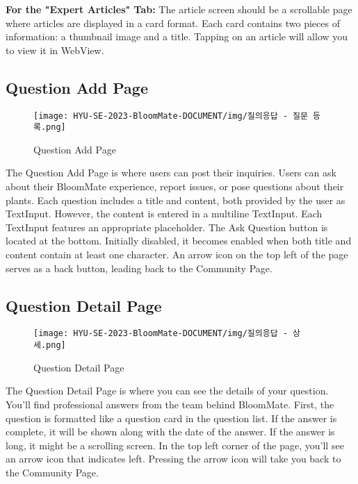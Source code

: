 \documentclass[conference, a4paper]{IEEEtran}
\begin{document}
\textbf{For the "Expert Articles" Tab:} The article screen should be a scrollable page where articles are displayed in a card format. Each card contains two pieces of information: a thumbnail image and a title. Tapping on an article will allow you to view it in WebView.

\subsection{Question Add Page}
    \begin{figure}[h]
    \centering
    \texttt{[image: HYU-SE-2023-BloomMate-DOCUMENT/img/질의응답 - 질문 등록.png]}
    \label{fig}
    \caption{Question Add Page}
    \end{figure}
    
The Question Add Page is where users can post their inquiries. Users can ask about their BloomMate experience, report issues, or pose questions about their plants. Each question includes a title and content, both provided by the user as TextInput. However, the content is entered in a multiline TextInput. Each TextInput features an appropriate placeholder. The Ask Question button is located at the bottom. Initially disabled, it becomes enabled when both title and content contain at least one character. An arrow icon on the top left of the page serves as a back button, leading back to the Community Page.

\subsection{Question Detail Page}
    \begin{figure}[h]
    \centering
    \texttt{[image: HYU-SE-2023-BloomMate-DOCUMENT/img/질의응답 - 상세.png]}
    \label{fig}
    \caption{Question Detail Page}
    \end{figure}
The Question Detail Page is where you can see the details of your question. You'll find professional answers from the team behind BloomMate. First, the question is formatted like a question card in the question list. If the answer is complete, it will be shown along with the date of the answer. If the answer is long, it might be a scrolling screen. In the top left corner of the page, you'll see an arrow icon that indicates left. Pressing the arrow icon will take you back to the Community Page.
\end{document}
